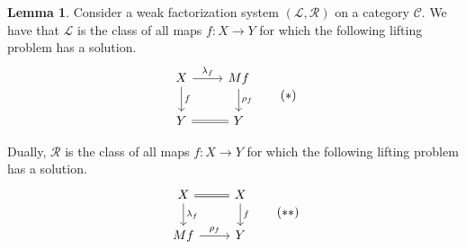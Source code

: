 \documentclass{article}
\theoremstyle{definition}
\newtheorem{lemma}[definition]{Lemma}
\newcommand{\C}{\mathcal C}
\begin{document}
\begin{lemma}
    \label{lem:factorization}
    Consider a weak factorization system $(\mathcal L, \mathcal R)$ on a category $\C$. We have that $\mathcal L$ is the class of all maps $f: X \to Y$ for which the following lifting problem has a solution.
    \[
         \begin{tikzcd}
             X \ar[r,"\lambda_f"] \ar[d,"f"] & Mf \ar[d,"\rho_f"]
             \\ 
             Y \ar[r,equal] & Y
         \end{tikzcd}
         \tag{$*$}
    \]

    Dually, $\mathcal R$ is the class of all maps $f: X \to Y$ for which the following lifting problem has a solution.
    \[
         \begin{tikzcd}
             X \ar[r,equal] \ar[d,"\lambda_f"] & X \ar[d,"f"]
             \\ 
             Mf \ar[r,"\rho_f"] & Y
         \end{tikzcd}
         \tag{$**$}
    \]
\end{lemma}
\end{document}
